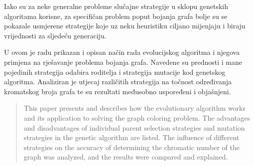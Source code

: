 \documentclass[times, utf8, zavrsni, numeric]{fer}
\begin{document}
Iako su za neke generalne probleme slučajne strategije u sklopu genetskih algoritama korisne, za specifičan problem poput bojanja grafa bolje su se pokazale usmjerene strategije koje uz neku heuristiku ciljano mijenjaju i biraju vrijednosti za sljedeću generaciju.





\begin{sazetak}
U ovom je radu prikazan i opisan način rada evolucijskog algoritma i njegova primjena na rješavanje problema bojanja grafa. Navedene su prednosti i mane pojedinih strategija odabira roditelja i strategija mutacije kod genetskog algoritma. Analiziran je utjecaj različitih strategija na točnost određivanja kromatskog broja grafa te su rezultati međusobno uspoređeni i objašnjeni.

\end{sazetak}

\begin{abstract}
This paper presents and describes how the evolutionary algorithm works and its application to solving the graph coloring problem. The advantages and disadvantages of individual parent selection strategies and mutation strategies in the genetic algorithm are listed. The influence of different strategies on the accuracy of determining the chromatic number of the graph was analyzed, and the results were compared and explained.

\end{abstract}
\end{document}
